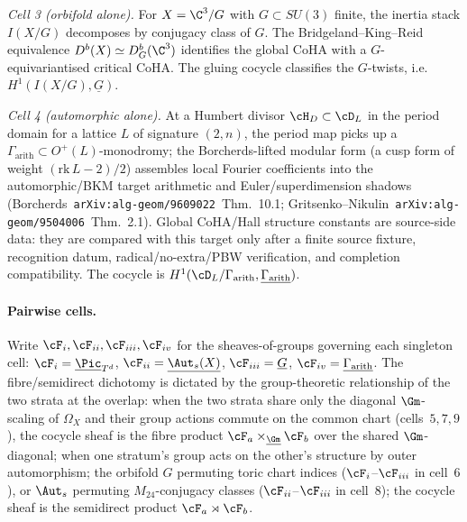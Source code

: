 \emph{Cell 3 (orbifold alone).} For $X=\C^{3}/G$ with
$G\subset SU(3)$ finite, the inertia stack $I(X/G)$ decomposes by
conjugacy class of $G$. The Bridgeland--King--Reid equivalence
$D^{b}(X)\simeq D^{b}_{G}(\C^{3})$ identifies the global CoHA with a
$G$-equivariantised critical CoHA. The gluing cocycle classifies the
$G$-twists, i.e. $H^{1}(I(X/G),\underline{G})$.

\emph{Cell 4 (automorphic alone).} At a Humbert divisor
$\cH_{D}\subset\cD_{L}$ in the period domain for a lattice $L$ of
signature $(2,n)$, the period map picks up a
$\Gamma_{\mathrm{arith}}\subset O^{+}(L)$-monodromy; the
Borcherds-lifted modular form (a cusp form of weight
$(\mathrm{rk}\,L-2)/2$) assembles local Fourier coefficients into the
automorphic/BKM target arithmetic and Euler/superdimension shadows
(Borcherds~\texttt{arXiv:alg-geom/9609022}~Thm.~10.1;
Gritsenko--Nikulin~\texttt{arXiv:alg-geom/9504006}~Thm.~2.1).
Global CoHA/Hall structure constants are source-side data: they are
compared with this target only after a finite source fixture,
recognition datum, radical/no-extra/PBW verification, and completion
compatibility. The cocycle is $H^{1}(\cD_{L}/\Gamma_{\mathrm{arith}},
\underline{\Gamma_{\mathrm{arith}}})$.

\paragraph{Pairwise cells.} Write $\cF_{i},\cF_{ii},\cF_{iii},\cF_{iv}$
for the sheaves-of-groups governing each singleton cell:
$\cF_{i}=\underline{\Pic}_{T^{d}}$,
$\cF_{ii}=\underline{\Aut_{s}(X)}$, $\cF_{iii}=\underline{G}$,
$\cF_{iv}=\underline{\Gamma_{\mathrm{arith}}}$. The fibre/semidirect
dichotomy is dictated by the group-theoretic relationship of the two
strata at the overlap: when the two strata share only the diagonal
$\Gm$-scaling of $\Omega_{X}$ and their group actions commute on the
common chart (cells~$5,7,9$), the cocycle sheaf is the fibre product
$\cF_{a}\times_{\underline{\Gm}}\cF_{b}$ over the shared
$\Gm$-diagonal; when one stratum's group acts on the other's
structure by outer automorphism; the orbifold $G$ permuting toric
chart indices ($\cF_{i}$--$\cF_{iii}$ in cell~$6$), or $\Aut_{s}$
permuting $M_{24}$-conjugacy classes ($\cF_{ii}$--$\cF_{iii}$ in
cell~$8$); the cocycle sheaf is the semidirect product
$\cF_{a}\rtimes\cF_{b}$.

